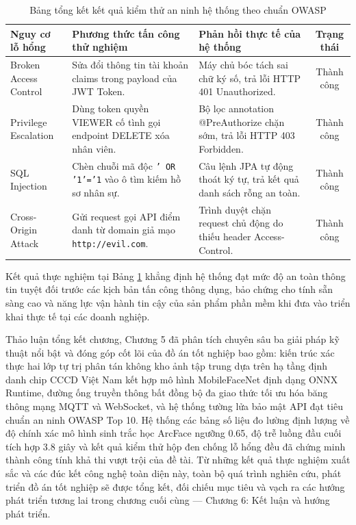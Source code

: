 \documentclass[../DoAn.tex]{subfiles}
\begin{document}
\begin{table}[ht!]
\centering
\small
\renewcommand{\arraystretch}{1.3}
\caption{Bảng tổng kết kết quả kiểm thử an ninh hệ thống theo chuẩn OWASP}
\label{tab:security_validation}
\begin{tabular}{|p{2.5cm}|p{4.5cm}|p{4.5cm}|c|}
\hline
\textbf{Nguy cơ lỗ hổng} & \textbf{Phương thức tấn công thử nghiệm} & \textbf{Phản hồi thực tế của hệ thống} & \textbf{Trạng thái} \\ \hline
Broken Access Control & Sửa đổi thông tin tài khoản claims trong payload của JWT Token. & Máy chủ bóc tách sai chữ ký số, trả lỗi HTTP 401 Unauthorized. & Thành công \\ \hline
Privilege Escalation & Dùng token quyền VIEWER cố tình gọi endpoint DELETE xóa nhân viên. & Bộ lọc annotation @PreAuthorize chặn sớm, trả lỗi HTTP 403 Forbidden. & Thành công \\ \hline
SQL Injection & Chèn chuỗi mã độc \texttt{' OR '1'='1} vào ô tìm kiếm hồ sơ nhân sự. & Câu lệnh JPA tự động thoát ký tự, trả kết quả danh sách rỗng an toàn. & Thành công \\ \hline
Cross-Origin Attack & Gửi request gọi API điểm danh từ domain giả mạo \texttt{http://evil.com}. & Trình duyệt chặn request chủ động do thiếu header Access-Control. & Thành công \\ \hline
\end{tabular}
\end{table}

Kết quả thực nghiệm tại Bảng \ref{tab:security_validation} khẳng định hệ thống đạt mức độ an toàn thông tin tuyệt đối trước các kịch bản tấn công thông dụng, bảo chứng cho tính sẵn sàng cao và năng lực vận hành tin cậy của sản phẩm phần mềm khi đưa vào triển khai thực tế tại các doanh nghiệp.

Thảo luận tổng kết chương, Chương 5 đã phân tích chuyên sâu ba giải pháp kỹ thuật nổi bật và đóng góp cốt lõi của đồ án tốt nghiệp bao gồm: kiến trúc xác thực hai lớp tự trị phân tán không kho ảnh tập trung dựa trên hạ tầng định danh chip CCCD Việt Nam kết hợp mô hình MobileFaceNet định dạng ONNX Runtime, đường ống truyền thông bất đồng bộ đa giao thức tối ưu hóa băng thông mạng MQTT và WebSocket, và hệ thống tường lửa bảo mật API đạt tiêu chuẩn an ninh OWASP Top 10. Hệ thống các bảng số liệu đo lường định lượng về độ chính xác mô hình sinh trắc học ArcFace ngưỡng 0.65, độ trễ luồng đầu cuối tích hợp 3.8 giây và kết quả kiểm thử hộp đen chống lỗ hổng đều đã chứng minh thành công tính khả thi vượt trội của đề tài. Từ những kết quả thực nghiệm xuất sắc và các đúc kết công nghệ toàn diện này, toàn bộ quá trình nghiên cứu, phát triển đồ án tốt nghiệp sẽ được tổng kết, đối chiếu mục tiêu và vạch ra các hướng phát triển tương lai trong chương cuối cùng — Chương 6: Kết luận và hướng phát triển.
\end{document}
